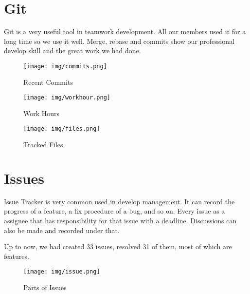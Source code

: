 \section{Git}
\label{sec:git}
  Git is a very useful tool in teamwork development. All our members used it for a long time so we use it well.
  Merge, rebase and commits show our professional develop skill and the great work we had done.
  \begin{figure}[H]
    \centering
    \texttt{[image: img/commits.png]}
    \caption{Recent Commits\label{fig:commits}}
  \end{figure}
  \begin{figure}[H]
    \centering
    \texttt{[image: img/workhour.png]}
    \caption{Work Hours\label{fig:workhour}}
  \end{figure}
  \begin{figure}[H]
    \centering
    \texttt{[image: img/files.png]}
    \caption{Tracked Files\label{fig:files}}
  \end{figure}
\section{Issues}
\label{sec:issue}
  Issue Tracker is very common used in develop management. It can record the progress of a feature, a fix procedure of a bug, and so on.
  Every issue as a assignee that has responsibility for that issue with a deadline. Discussions can also be made and recorded under that.

  Up to now, we had created 33 issues, resolved 31 of them, most of which are features.
  \begin{figure}[H]
    \centering
    \texttt{[image: img/issue.png]}
    \caption{Parts of Issues\label{fig:issue}}
  \end{figure}

